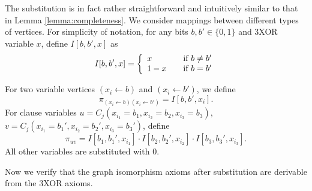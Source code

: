 \documentclass[a4paper,twoside,justified]{tufte-handout}
\begin{document}
The substitution is in fact rather straightforward and intuitively similar to that in Lemma \ref{lemma:completeness}. 
We consider mappings between different types of vertices. 
For simplicity of notation, for any bits $b,b' \in \{0,1\}$ and 3XOR variable $x$, define $I[b,b',x]$ as
\[
I[b,b',x] = 
\left\{
\begin{array}{l l}
  x &\quad \textrm{if } b \ne b' \\
  1-x &\quad \textrm{if } b = b'
\end{array}
\right.
\]

For two variable vertices
$(x_i \leftarrow b)$ and $(x_i \leftarrow b')$, we define
\[
\pi_{(x_i \leftarrow b)(x_i \leftarrow b')} = I[b,b',x_i].
\]
For clause variables $u=C_j(x_{i_1}=b_1,x_{i_2}=b_2,x_{i_3}=b_3)$,
$v=C_j(x_{i_1}=b_1',x_{i_2}=b_2',x_{i_3}=b_3')$, define
\[
\pi_{uv} = I[b_1,b_1',x_{i_1}] \cdot I[b_2,b_2',x_{i_2}] \cdot I[b_3,b_3',x_{i_3}].
\]
All other variables are substituted with $0$.

Now we verify that the graph isomorphism axioms after substitution are derivable from the 3XOR axioms.
\end{document}
